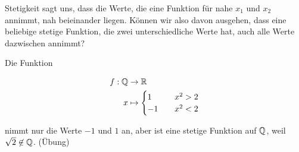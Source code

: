\thispagestyle{pagenumberonly}

Stetigkeit sagt uns, dass die Werte, die eine Funktion für nahe $x_1$ und $x_2$ annimmt, nah beieinander liegen. Können wir also davon ausgehen, dass eine beliebige stetige Funktion, die zwei unterschiedliche Werte hat, auch alle Werte dazwischen annimmt?

\begin{beispiel}
    Die Funktion
    \begin{minipage}{.5\textwidth}
        \begin{align*}
            f: \mathbb{Q} &\rightarrow{} \mathbb{R}\\
            x &\mapsto
            \begin{cases}
                1\quad &x^2 > 2\\
                -1\quad &x^2 < 2
            \end{cases}
        \end{align*}
    \end{minipage}
    \begin{minipage}{.5\textwidth}
        \centering
        \begin{figure}[H]
        \end{figure}
    \end{minipage}
    nimmt nur die Werte $-1$ und $1$ an, aber ist eine stetige Funktion auf $\mathbb{Q}$, weil $\sqrt{2}\not\in\mathbb{Q}$. (Übung)
\end{beispiel}

